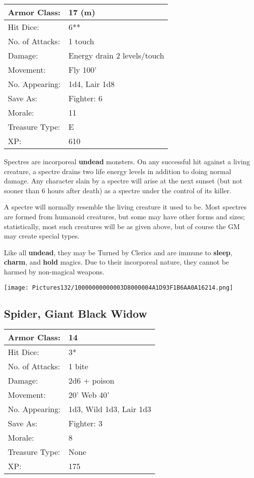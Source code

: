 \documentclass[a4paper,twoside,openany,10pt]{book}
\begin{document}
\begin{multicols}{2}
\begin{tabularx}{0.50\textwidth}{@{}lX@{}}
Armor Class: & 17 (m) \\\hline
Hit Dice: & 6** \\\hline
No. of Attacks: & 1 touch \\\hline
Damage: & Energy drain 2 levels/touch \\\hline
Movement: & Fly 100' \\\hline
No. Appearing: & 1d4, Lair 1d8 \\\hline
Save As: & Fighter: 6 \\\hline
Morale: & 11 \\\hline
Treasure Type: & E \\\hline
XP: & 610 \\\hline
\end{tabularx}\medskip

Spectres are incorporeal \textbf{undead} monsters. On any successful hit against a living creature, a spectre drains two life energy levels in addition to doing normal damage. Any character slain by a spectre will arise at the next sunset (but not sooner than 6 hours after death) as a spectre under the control of its killer.

A spectre will normally resemble the living creature it used to be. Most spectres are formed from humanoid creatures, but some may have other forms and sizes; statistically, most such creatures will be as given above, but of course the GM may create special types.

Like all \textbf{undead}, they may be Turned by Clerics and are immune to \textbf{sleep}, \textbf{charm},\textbf{ }and \textbf{hold} magics. Due to their incorporeal nature, they cannot be harmed by non-magical weapons.

\begin{center} \texttt{[image: Pictures132/10000000000003D8000004A1D93F1B6AA0A16214.png]} \end{center}


\subsection*{Spider, Giant Black Widow}\label{spider-giant-black-widow}

\begin{tabularx}{0.50\textwidth}{@{}lX@{}}
Armor Class: & 14 \\\hline
Hit Dice: & 3* \\\hline
No. of Attacks: & 1 bite \\\hline
Damage: & 2d6 + poison \\\hline
Movement: & 20' Web 40' \\\hline
No. Appearing: & 1d3, Wild 1d3, Lair 1d3 \\\hline
Save As: & Fighter: 3 \\\hline
Morale: & 8 \\\hline
Treasure Type: & None \\\hline
XP: & 175 \\\hline
\end{tabularx}\medskip


\end{multicols}
\end{document}
